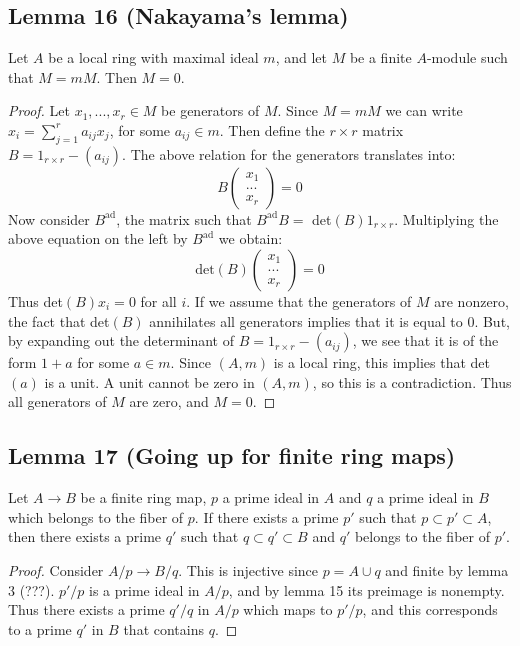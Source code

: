 \documentclass[12 pt]{article}
\begin{document}
\subsection*{Lemma 16 (Nakayama's lemma)}
Let $A$ be a local ring with maximal ideal $m$, and let $M$ be a finite $A$-module such that $M = mM$. Then $M=0$.
\begin{proof}
Let $x_1, ... , x_r \in M$ be generators of $M$. Since $M = mM$ we can write $x_i = \sum_{j=1}^r a_{ij} x_j$, for some $a_{ij} \in m$. Then define the $r\times r$ matrix $B = 1_{r\times r} - (a_{ij})$. The above relation for the generators translates into:
\[     B \left(  \begin{array} {c} x_1 \\ ... \\ x_r  \end{array}  \right)  = 0   \]
Now consider $B^{\text{ad}}$, the matrix such that $B^{\text{ad}} B =$ det$(B) 1_{r\times r}$. Multiplying the above equation on the left by $B^{\text{ad}}$ we obtain:
\[    \text{det}(B) \left(  \begin{array} {c} x_1 \\ ... \\ x_r  \end{array}  \right)  = 0   \]
Thus det$(B) x_i = 0$ for all $i$. If we assume that the generators of $M$ are nonzero, the fact that det$(B)$ annihilates all generators implies that it is equal to 0. But, by expanding out the determinant of $B = 1_{r\times r} - (a_{ij})$, we see that it is of the form $1+a$ for some $a\in m$. Since $(A,m)$ is a local ring, this implies that det$(a)$ is a unit. A unit cannot be zero in $(A, m)$, so this is a contradiction. Thus all generators of $M$ are zero, and $M=0$.
\end{proof}

\subsection*{Lemma 17 (Going up for finite ring maps)}
Let $A \to B$ be a finite ring map, $p$ a prime ideal in $A$ and $q$ a prime ideal in $B$ which belongs to the fiber of $p$. If there exists a prime $p'$ such that $p \subset p' \subset A$, then there exists a prime $q'$ such that $q\subset q' \subset B$ and $q'$ belongs to the fiber of $p'$.
\begin{proof}
Consider $A/p \to B/q$. This is injective since $p = A \cup q$ and finite by lemma 3 (???). $p'/p$ is a prime ideal in $A/p$, and by lemma 15 its preimage is nonempty. Thus there exists a prime $q'/q$ in $A/p$ which maps to $p'/p$, and this corresponds to a prime $q'$ in $B$ that contains $q$.
\end{proof}
\end{document}
